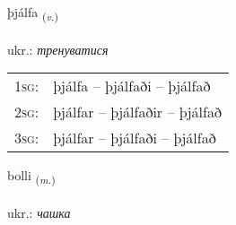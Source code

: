 \documentclass[frontgrid, backgrid]{flacards}\usepackage[]{graphicx}\usepackage[]{xcolor}
\begin{document}
\renewcommand{\flhead}{\vskip5pt \fboxsep=0pt {\small\bfseries\footnotesize Sagnorð | дієслово}}
\renewcommand{\fcfoot}{\vskip5pt \fboxsep=0pt \hspace{2pt}{\small\bfseries\footnotesize 3K}}

\renewcommand{\blhead}{\vskip5pt {\small\bfseries\footnotesize Sagnorð | дієслово }}
\renewcommand{\bcfoot}{\vskip5pt \hspace{2pt}{\small\bfseries\footnotesize 3K}}


{þjálfa \small{\textsubscript{(\textit{v.})}} \\[1ex] %
\textphonetic{[θjaulva]} \\
ukr.: \emph{тренуватися} \\  [2ex]
\renewcommand*{\arraystretch}{0.8}
\begin{tabular}{p{1cm}l}
\textsc{1sg}: & þjálfa -- þjálfaði -- þjálfað \\ 
\textsc{2sg}: & þjálfar -- þjálfaðir -- þjálfað \\ 
\textsc{3sg}: & þjálfar -- þjálfaði -- þjálfað \\ 
\end{tabular}
}

\renewcommand{\flhead}{\vskip5pt \fboxsep=0pt {\small\bfseries\footnotesize Nafnorð | іменник}}
\renewcommand{\fcfoot}{\vskip5pt \fboxsep=0pt \hspace{2pt}{\small\bfseries\footnotesize 3K}}

\renewcommand{\blhead}{\vskip5pt {\small\bfseries\footnotesize Nafnorð | іменник }}
\renewcommand{\bcfoot}{\vskip5pt \hspace{2pt}{\small\bfseries\footnotesize 3K}}


{bolli \small{\textsubscript{(\textit{m.})}} \\[1ex] %
\textphonetic{[pɔtlɪ]} \\
ukr.: \emph{чашка} \\  [2ex]
\renewcommand*{\arraystretch}{0.8}
}
\end{document}
